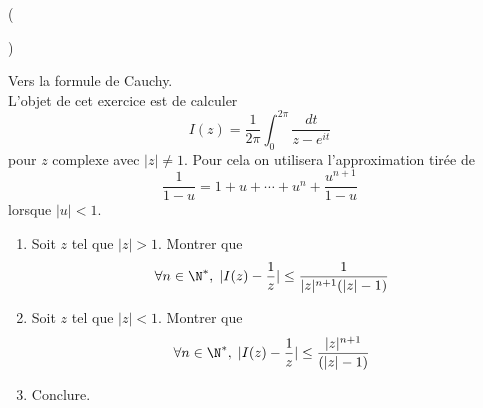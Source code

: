 \begin{tiny}()\end{tiny} Vers la formule de Cauchy.\\
L'objet de cet exercice est de calculer
\begin{displaymath}
 I(z) = \frac{1}{2\pi}\int_0^{2\pi}\frac{dt}{z-e^{it}}
\end{displaymath}
pour $z$ complexe avec $|z|\neq1$. Pour cela on utilisera l'approximation tirée de 
\begin{displaymath}
 \frac{1}{1-u}=1+u+\cdots+u^n+\frac{u^{n+1}}{1-u}
\end{displaymath}
lorsque $|u|<1$.
\begin{enumerate}
 \item Soit $z$ tel que $|z|>1$. Montrer que
\begin{displaymath}
 \forall n\in\N^*,\;
|I(z)-\frac{1}{z}|\leq \frac{1}{|z|^{n+1}(|z|-1)}
\end{displaymath}
 \item Soit $z$ tel que $|z|<1$. Montrer que
\begin{displaymath}
 \forall n\in\N^*,\;
|I(z)-\frac{1}{z}|\leq \frac{|z|^{n+1}}{(|z|-1)}
\end{displaymath}
\item Conclure.
\end{enumerate}
